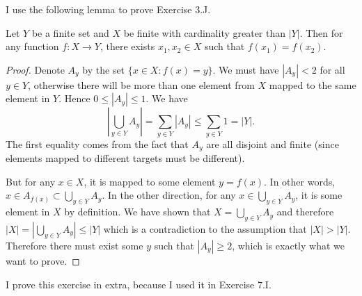 
I use the following lemma to prove Exercise 3.J.
\begin{lemma}
	Let $Y$ be a finite set and $X$ be finite with cardinality greater than $|Y|$. Then for any function $f: X \to  Y$, there exists $x_1, x_2 \in X$ such that $f(x_1) = f(x_2)$.
\end{lemma}
\begin{proof}
Denote $A_y$ by the set $\{x \in X: f(x) = y\} $. We must have $|A_y| < 2$ for all $y \in Y$, otherwise there will be more than one element from $X$ mapped to the same element in $Y$. Hence $0 \le |A_y| \le  1$. We have
\[
\left| \bigcup_{y \in Y} A_y \right| = \sum_{y \in Y } |A_y| \le \sum_{y \in Y} 1 =  |Y|
.\] 
The first equality comes from the fact that $A_y$ are all disjoint and finite (since elements mapped to different targets must be different).

But for any $x \in X$, it is mapped to some element $y = f(x)$. In other words, $x \in A_{f(x)} \subset \bigcup_{y \in Y} A_y$. In the other direction, for any $x \in \bigcup_{y \in Y} A_y$, it is some element in $X$ by definition. We have shown that $X = \bigcup_{y \in Y} A_y$ and therefore $|X| = \left| \bigcup_{y \in  Y} A_y \right| \le |Y|$ which is a contradiction to the assumption that $|X| > |Y|$. Therefore there must exist some $y$ such that  $|A_y| \ge 2$, which is exactly what we want to prove.
\end{proof}

I prove this exercise in extra, because I used it in Exercise 7.I.

